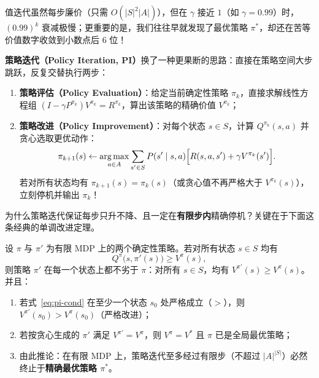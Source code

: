 值迭代虽然每步廉价（只需 $O(|S|^2 |A|)$），但在 $\gamma$ 接近 $1$（如 $\gamma = 0.99$）时，$(0.99)^k$ 衰减极慢；更重要的是，我们往往早就发现了最优策略 $\pi^*$，却还在苦等价值数字收敛到小数点后 6 位！

\textbf{策略迭代（Policy Iteration, PI）}换了一种更果断的思路：直接在策略空间大步跳跃，反复交替执行两步：
\begin{enumerate}
  \item \textbf{策略评估（Policy Evaluation）}：给定当前确定性策略 $\pi_k$，直接求解线性方程组 $(I - \gamma P^{\pi_k}) V^{\pi_k} = R^{\pi_k}$，算出该策略的精确价值 $V^{\pi_k}$；
  \item \textbf{策略改进（Policy Improvement）}：对每个状态 $s \in S$，计算 $Q^{\pi_k}(s, a)$ 并贪心选取更优动作：
  \[
    \pi_{k+1}(s) \leftarrow \operatorname*{arg\,max}_{a \in A} \sum_{s' \in S} P(s' \mid s, a)\Big[R(s, a, s') + \gamma V^{\pi_k}(s')\Big].
  \]
  若对所有状态均有 $\pi_{k+1}(s) = \pi_k(s)$（或贪心值不再严格大于 $V^{\pi_k}(s)$），立刻停机并输出 $\pi_k$！
\end{enumerate}

为什么策略迭代保证每步只升不降、且一定在\textbf{有限步内}精确停机？关键在于下面这条经典的单调改进定理。

\begin{thmBox}
\begin{theorem}[策略改进定理与策略迭代有限收敛性]\label{thm:policy-improvement}
设 $\pi$ 与 $\pi'$ 为有限 MDP 上的两个确定性策略。若对所有状态 $s \in S$ 均有
\begin{equation}\label{eq:pi-cond}
  Q^\pi\big(s, \pi'(s)\big) \ge V^\pi(s),
\end{equation}
则策略 $\pi'$ 在每一个状态上都不劣于 $\pi$：对所有 $s \in S$，均有 $V^{\pi'}(s) \ge V^\pi(s)$。并且：
\begin{enumerate}
  \item 若式~\eqref{eq:pi-cond} 在至少一个状态 $s_0$ 处严格成立（$>$），则 $V^{\pi'}(s_0) > V^\pi(s_0)$（严格改进）；
  \item 若按贪心生成的 $\pi'$ 满足 $V^{\pi'} = V^\pi$，则 $V^\pi = V^*$ 且 $\pi$ 已是全局最优策略；
  \item 由此推论：在有限 MDP 上，策略迭代至多经过有限步（不超过 $|A|^{|S|}$）必然终止于\textbf{精确最优策略 $\pi^*$}。
\end{enumerate}
\end{theorem}
\end{thmBox}

